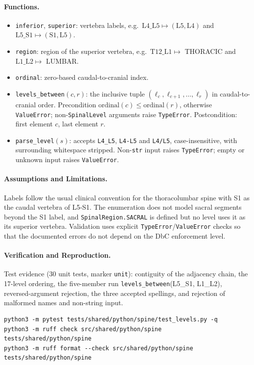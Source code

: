\paragraph{Functions.}
\begin{itemize}
  \item \texttt{inferior}, \texttt{superior}: vertebra labels, e.g.\
    $\mathrm{L4\_L5} \mapsto (\mathrm{L5}, \mathrm{L4})$ and
    $\mathrm{L5\_S1} \mapsto (\mathrm{S1}, \mathrm{L5})$.
  \item \texttt{region}: region of the superior vertebra, e.g.\
    $\mathrm{T12\_L1} \mapsto$ THORACIC and $\mathrm{L1\_L2} \mapsto$ LUMBAR.
  \item \texttt{ordinal}: zero-based caudal-to-cranial index.
  \item \texttt{levels\_between}$(c, r)$: the inclusive tuple
    $(\ell_{c}, \ell_{c+1}, \dots, \ell_{r})$ in caudal-to-cranial order.
    Precondition $\mathrm{ordinal}(c) \le \mathrm{ordinal}(r)$, otherwise
    \texttt{ValueError}; non-\texttt{SpinalLevel} arguments raise
    \texttt{TypeError}. Postcondition: first element $c$, last element $r$.
  \item \texttt{parse\_level}$(s)$: accepts \texttt{L4\_L5}, \texttt{L4-L5} and
    \texttt{L4/L5}, case-insensitive, with surrounding whitespace stripped.
    Non-\texttt{str} input raises \texttt{TypeError}; empty or unknown input
    raises \texttt{ValueError}.
\end{itemize}

\paragraph{Assumptions and Limitations.}
Labels follow the usual clinical convention for the thoracolumbar spine with
S1 as the caudal vertebra of L5-S1. The enumeration does not model sacral
segments beyond the S1 label, and \texttt{SpinalRegion.SACRAL} is defined but
no level uses it as its superior vertebra. Validation uses explicit
\texttt{TypeError}/\texttt{ValueError} checks so that the documented errors do
not depend on the DbC enforcement level.

\paragraph{Verification and Reproduction.}
Test evidence (30 unit tests, marker \texttt{unit}): contiguity of the adjacency
chain, the 17-level ordering, the five-member run \texttt{levels\_between}(L5\_S1,
L1\_L2), reversed-argument rejection, the three accepted spellings, and rejection
of malformed names and non-string input.
\begin{verbatim}
python3 -m pytest tests/shared/python/spine/test_levels.py -q
python3 -m ruff check src/shared/python/spine tests/shared/python/spine
python3 -m ruff format --check src/shared/python/spine tests/shared/python/spine
\end{verbatim}
